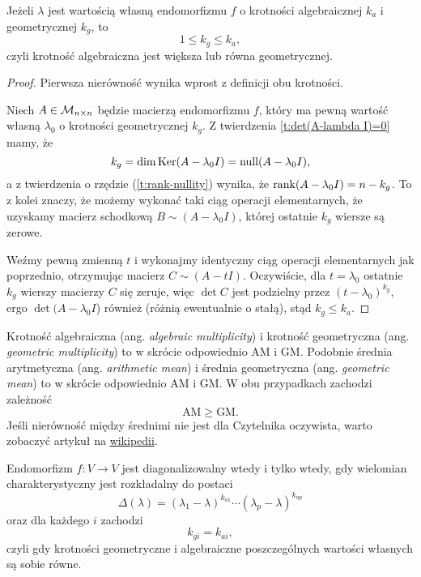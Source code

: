 \begin{lemma}
    Jeżeli $\lambda$ jest wartością własną endomorfizmu $f$ o krotności algebraicznej $k_a$ i geometrycznej $k_g$, to
    \[ 1 \leq k_g \leq k_a, \]
    czyli krotność algebraiczna jest większa lub równa geometrycznej.
\end{lemma}
\begin{proof}
    Pierwsza nierówność wynika wprost z definicji obu krotności.

    Niech $A \in \mathcal M_{n\times n}$ będzie macierzą endomorfizmu $f$, który ma pewną wartość własną $\lambda_0$ o krotności geometrycznej $k_g$. Z twierdzenia \ref{t:det(A-lambda I)=0} mamy, że
    \[ k_g = \dim \operatorname{Ker}(A - \lambda_0 I) = \operatorname{null}(A - \lambda_0 I), \]
    a z twierdzenia o rzędzie (\ref{t:rank-nullity}) wynika, że $\operatorname{rank} (A - \lambda_0 I) = n - k_g$. To z kolei znaczy, że możemy wykonać taki ciąg operacji elementarnych, że uzyskamy macierz schodkową $B \sim (A - \lambda_0 I)$, której ostatnie $k_g$ wiersze są zerowe.

    Weźmy pewną zmienną $t$ i wykonajmy identyczny ciąg operacji elementarnych jak poprzednio, otrzymując macierz $C \sim (A - t I)$. Oczywiście, dla $t = \lambda_0$ ostatnie $k_g$ wierszy macierzy $C$ się zeruje, więc $\det C$ jest podzielny przez $(t - \lambda_0)^{k_g}$, ergo $\det (A - \lambda_0 I$) również (różnią ewentualnie o stałą), stąd $k_g \leq k_a$.
\end{proof}

\begin{remark*}[mnemotechnika]
    Krotność algebraiczna (ang. \textit{algebraic multiplicity}) i krotność geometryczna (ang. \textit{geometric multiplicity}) to w skrócie odpowiednio AM i GM. Podobnie średnia arytmetyczna (ang. \textit{arithmetic mean}) i średnia geometryczna (ang. \textit{geometric mean}) to w skrócie odpowiednio AM i GM. W obu przypadkach zachodzi zależność
    \[ \text{AM} \geq \text{GM}. \]
    Jeśli nierówność między średnimi nie jest dla Czytelnika oczywista, warto zobaczyć artykuł na \href{https://en.wikipedia.org/wiki/AM-GM_Inequality}{wikipedii}.
\end{remark*}

\begin{theorem}
    \label{t:endomorphism is diagonalizable iff polynomial...}
    Endomorfizm $f : V \to V$ jest diagonalizowalny wtedy i tylko wtedy, gdy wielomian charakterystyczny jest rozkładalny do postaci
    \[ \Delta(\lambda) = (\lambda_1 - \lambda)^{k_{a1}}\cdots(\lambda_p - \lambda)^{k_{ap}} \]
    oraz dla każdego $i$ zachodzi
    \[ k_{gi} = k_{ai}, \]
    czyli gdy krotności geometryczne i algebraiczne poszczególnych wartości własnych są sobie równe.
\end{theorem}

